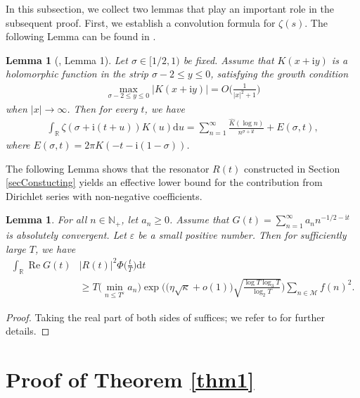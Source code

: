 \documentclass[12pt,reqno]{amsart}
\newtheorem{lem}[thm]{Lemma}
\theoremstyle{definition}
\numberwithin{equation}{section}
\newcommand{\bgl}{\big(}
\newcommand{\bgr}{\big)}
\newcommand{\bggl}{\bigg(}
\newcommand{\bggr}{\bigg)}
\newcommand{\Bgl}{\Big(}
\newcommand{\Bgr}{\Big)}
\newcommand{\lo}{\log_2}
\newcommand{\lt}{\log_3}
\newcommand{\ph}{\Phi}
\newcommand{\mbr}{\mathbb{R}}
\newcommand{\mbn}{\mathbb{N}}
\newcommand{\mcm}{\mathcal{M}}
\newcommand{\mmd}{\mathrm{d}}
\newcommand{\mmi}{\mathrm{i}}
\newcommand{\mit}{\mathrm{i}t}
\newcommand{\re}{\operatorname{Re}}
\begin{document}
In this subsection, we collect two lemmas that play an important role in the subsequent proof. First, we establish a convolution formula for \(\zeta(s)\). The following Lemma can be found in \cite{bondarenko2018argument}.
\begin{lem}[\cite{bondarenko2018argument}, Lemma 1]
    \label{pro1}
    Let \(\sigma \in [1/2,1)\) be fixed. Assume that \(K(x+\mmi y)\) is a holomorphic
function in the strip \(\sigma-2 \le y \le 0\), satisfying the growth condition
\begin{align}
    \label{pro1-growth}
    \max_{\sigma -2\le y \le 0}|K(x+\mmi y)| = O\Bgl \frac{1}{|x|^2+1} \Bgr
\end{align}
when \(|x| \to \infty\). Then for every \(t\), we have
\begin{align}
    \label{pro1-convolution}
    \int_\mbr \zeta(\sigma+\mmi(t+u))K(u)\mmd u = \sum_{n=1}^\infty \frac{\widehat{K}(\log n)}{n^{\sigma+\mit}}+E(\sigma,t),
\end{align}
where \(E(\sigma,t) = 2\pi K(-t-\mmi(1-\sigma))\).
\end{lem}
\par
The following Lemma shows that the resonator \(R(t)\) constructed in Section \ref{secConstucting} yields an effective lower bound for the contribution from Dirichlet series with non-negative coefficients.
\begin{lem}
    \label{pro2}
    For all \(n \in \mbn_+\), let \(a_n \ge 0\). Assume that \(G(t)=\sum_{n=1}^\infty a_n n^{-1/2-\mit}\) is absolutely convergent. Let \(\varepsilon\) be a small positive number. Then for sufficiently large \(T\), we have
    \begin{align*}
        \int_\mbr\re G(t)& |R(t)|^2\ph\Bgl\frac{t}{T} \Bgr \mmd t  \nonumber \\
        &\ge T \bgl\min_{n \le T^\varepsilon} a_n\bgr \exp \bggl \bgl \eta \sqrt{\kappa} +o(1) \bgr \sqrt{\frac{\log T \lt T}{\lo T}}\bggr \sum_{n \in \mcm}f(n)^2.
    \end{align*}
\end{lem}
\begin{proof}
    Taking the real part of both sides of \cite[Lemma 6, Eq. (23)]{bondarenko2018argument} suffices; we refer to \cite[p. 1699]{bondarenko2017large} for further details.
\end{proof}

\section{Proof of Theorem \ref{thm1}}
\label{secprove}
\end{document}
